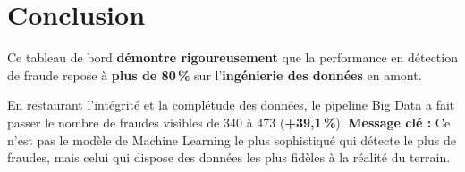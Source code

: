 \section{Conclusion}

Ce tableau de bord \textbf{démontre rigoureusement} que la performance en détection de fraude repose à \textbf{plus de 80\,\%} sur l’\textbf{ingénierie des données} en amont.

En restaurant l’intégrité et la complétude des données, le pipeline Big Data a fait passer le nombre de fraudes visibles de 340 à 473 (\textbf{+39,1\,\%}).
\noindent\textbf{Message clé :} Ce n’est pas le modèle de Machine Learning le plus sophistiqué qui détecte le plus de fraudes, mais celui qui dispose des données les plus fidèles à la réalité du terrain.
